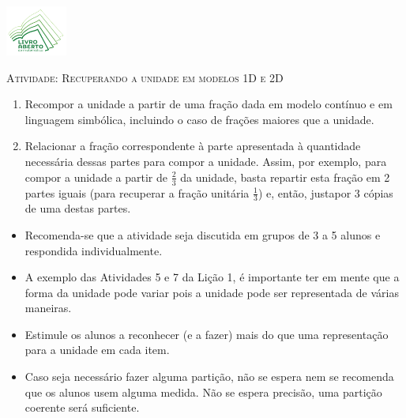 \documentclass[10 pt,usenames,dvipsnames, oneside]{article}
\begin{document}
\begin{center}
  \begin{minipage}[l]{3cm}
\includegraphics[width=2cm]{../../../Figuras/logo}       
\end{minipage}\hfill
\begin{minipage}[r]{.8\textwidth}
 {\Large \scshape Atividade: Recuperando a unidade em modelos 1D e 2D}  
\end{minipage}
\end{center}
\vspace{.2cm}

\ifdefined\prof
\begin{goals}
\begin{enumerate}

    \item       Recompor a unidade a partir de uma fração dada em modelo contínuo e em linguagem simbólica, incluindo o caso de frações maiores que a unidade.
    \item       Relacionar a fração correspondente à parte apresentada à quantidade necessária dessas partes para compor a unidade. Assim, por exemplo, para compor a unidade a partir de       $\frac{2}{3}$ da unidade, basta repartir esta fração em 2 partes iguais (para recuperar a fração unitária       $\frac{1}{3}$) e, então, justapor 3 cópias de uma destas partes.


\end{enumerate}
\tcblower

  \begin{itemize} %
    \item Recomenda-se que a atividade seja discutida em grupos de 3 a 5 alunos e respondida individualmente.
 \item A exemplo das Atividades 5 e 7 da Lição 1, é importante ter em mente que a forma da unidade pode variar pois a unidade pode ser representada de várias maneiras.
    \item Estimule os alunos a reconhecer (e a fazer) mais do que uma representação para a unidade em cada item.
    \item Caso seja necessário fazer alguma partição, não se espera nem se recomenda que os alunos usem alguma medida. Não se espera precisão, uma partição coerente será suficiente. 
\end{itemize} %

\end{goals}
\end{document}
